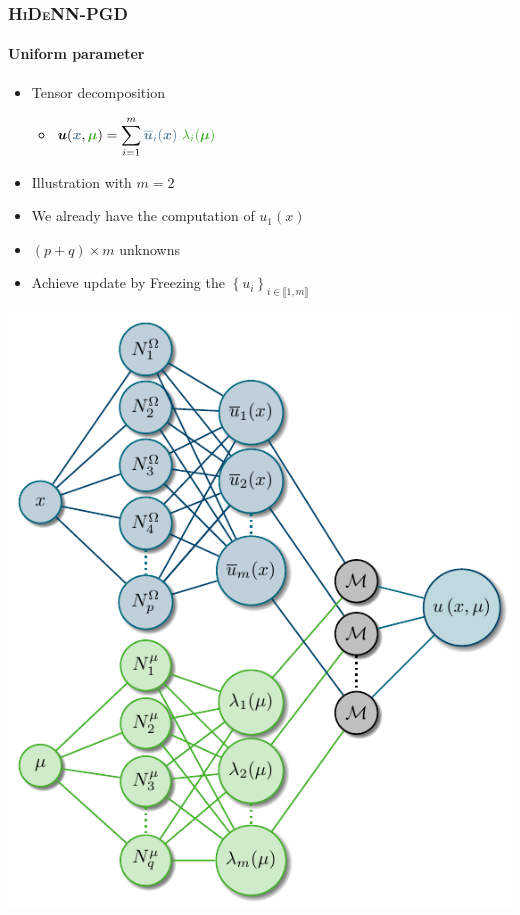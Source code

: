 \documentclass[aspectratio=1610]{beamer}
\begin{document}
	\begin{frame}
		\frametitle{\textsc{HiDeNN-PGD}}
		\framesubtitle{Uniform parameter}
		\begin{minipage}{0.48\linewidth}
			\begin{itemize}
				\item Tensor decomposition
				\begin{itemize}
					\item \small{$\displaystyle\vect{u}(\textcolor{BleuLMS!70}{\vect{x}},\textcolor{LGreenLMS}{\vect{\mu}}) = \sum\limits_{i=1}^m \textcolor{BleuLMS!70}{\overline{\vect{u}}_i(\vect{x})} ~\textcolor{LGreenLMS}{\lambda_i(\vect{\mu})}$} 
				\end{itemize}
				\item Illustration with $m=2$ 
				\item We already have the computation of $u_1(x)$
				\item $\left(p+q\right)\times m$ unknowns
				\item Achieve update by Freezing the $\left\{u_i\right\}_{i \in \llbracket 1,m \rrbracket}$
			\end{itemize}
		\end{minipage}
		\hfill 
		\begin{minipage}{0.48\linewidth}
			\centering
			\includegraphics[width=\linewidth]{Schema/NN_TD_Scheme.pdf}
		\end{minipage}
	\end{frame}
	
\end{document}
